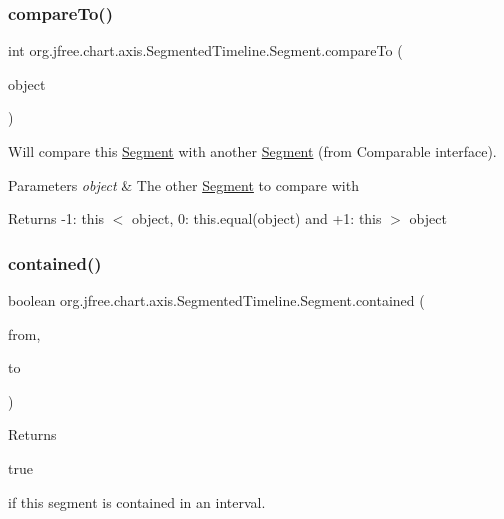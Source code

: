\subsubsection{\texorpdfstring{compare\+To()}{compareTo()}}
{\footnotesize\ttfamily int org.\+jfree.\+chart.\+axis.\+Segmented\+Timeline.\+Segment.\+compare\+To (\begin{DoxyParamCaption}\item[{Object}]{object }\end{DoxyParamCaption})}

Will compare this \mbox{\hyperlink{classorg_1_1jfree_1_1chart_1_1axis_1_1_segmented_timeline_1_1_segment}{Segment}} with another \mbox{\hyperlink{classorg_1_1jfree_1_1chart_1_1axis_1_1_segmented_timeline_1_1_segment}{Segment}} (from Comparable interface).


\begin{DoxyParams}{Parameters}
{\em object} & The other \mbox{\hyperlink{classorg_1_1jfree_1_1chart_1_1axis_1_1_segmented_timeline_1_1_segment}{Segment}} to compare with\\
\hline
\end{DoxyParams}
\begin{DoxyReturn}{Returns}
-\/1\+: this $<$ object, 0\+: this.\+equal(object) and +1\+: this $>$ object 
\end{DoxyReturn}
\mbox{\label{classorg_1_1jfree_1_1chart_1_1axis_1_1_segmented_timeline_1_1_segment_a53f2e56cf31107813c65f85ed5648c65}} 
\subsubsection{\texorpdfstring{contained()}{contained()}}
{\footnotesize\ttfamily boolean org.\+jfree.\+chart.\+axis.\+Segmented\+Timeline.\+Segment.\+contained (\begin{DoxyParamCaption}\item[{long}]{from,  }\item[{long}]{to }\end{DoxyParamCaption})}

Returns
\begin{DoxyCode}
\textcolor{keyword}{true} 
\end{DoxyCode}
 if this segment is contained in an interval.



